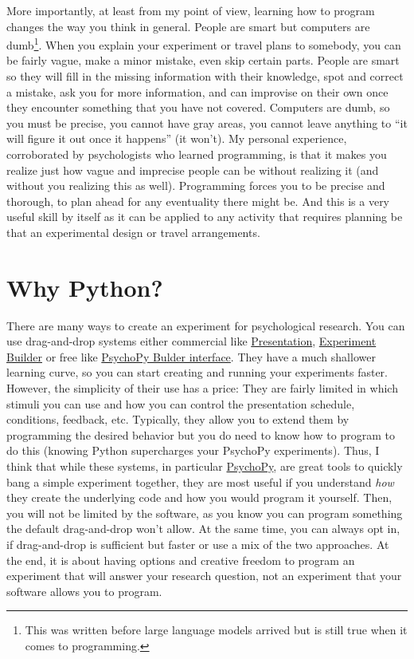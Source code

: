\documentclass[
]{book}
\begin{document}
More importantly, at least from my point of view, learning how to program changes the way you think in general. People are smart but computers are dumb\footnote{This was written before large language models arrived but is still true when it comes to programming.}. When you explain your experiment or travel plans to somebody, you can be fairly vague, make a minor mistake, even skip certain parts. People are smart so they will fill in the missing information with their knowledge, spot and correct a mistake, ask you for more information, and can improvise on their own once they encounter something that you have not covered. Computers are dumb, so you must be precise, you cannot have gray areas, you cannot leave anything to ``it will figure it out once it happens'' (it won't). My personal experience, corroborated by psychologists who learned programming, is that it makes you realize just how vague and imprecise people can be without realizing it (and without you realizing this as well). Programming forces you to be precise and thorough, to plan ahead for any eventuality there might be. And this is a very useful skill by itself as it can be applied to any activity that requires planning be that an experimental design or travel arrangements.

\hypertarget{why-python}{%
\section{Why Python?}\label{why-python}}

There are many ways to create an experiment for psychological research. You can use drag-and-drop systems either commercial like \href{https://www.neurobs.com/}{Presentation}, \href{https://www.sr-research.com/experiment-builder/}{Experiment Builder} or free like \href{https://psychopy.org/builder}{PsychoPy Bulder interface}. They have a much shallower learning curve, so you can start creating and running your experiments faster. However, the simplicity of their use has a price: They are fairly limited in which stimuli you can use and how you can control the presentation schedule, conditions, feedback, etc. Typically, they allow you to extend them by programming the desired behavior but you do need to know how to program to do this (knowing Python supercharges your PsychoPy experiments). Thus, I think that while these systems, in particular \href{https://psychopy.org/}{PsychoPy}, are great tools to quickly bang a simple experiment together, they are most useful if you understand \emph{how} they create the underlying code and how you would program it yourself. Then, you will not be limited by the software, as you know you can program something the default drag-and-drop won't allow. At the same time, you can always opt in, if drag-and-drop is sufficient but faster or use a mix of the two approaches. At the end, it is about having options and creative freedom to program an experiment that will answer your research question, not an experiment that your software allows you to program.
\end{document}
